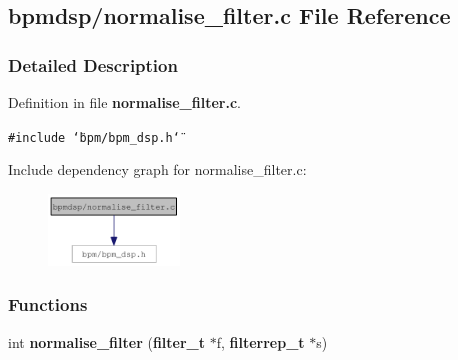 \subsection{bpmdsp/normalise\_\-filter.c File Reference}
\label{normalise__filter_8c}


\subsubsection{Detailed Description}


Definition in file {\bf normalise\_\-filter.c}.

{\tt \#include \char`\"{}bpm/bpm\_\-dsp.h\char`\"{}}\par


Include dependency graph for normalise\_\-filter.c:\nopagebreak
\begin{figure}[H]
\begin{center}
\leavevmode
\includegraphics[width=99pt]{normalise__filter_8c__incl}
\end{center}
\end{figure}
\subsubsection*{Functions}
\begin{CompactItemize}
\item 
int {\bf normalise\_\-filter} ({\bf filter\_\-t} $\ast$f, {\bf filterrep\_\-t} $\ast$s)
\end{CompactItemize}
